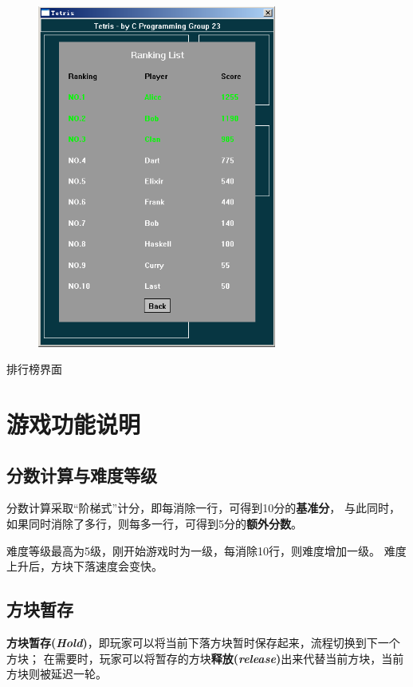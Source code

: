 \documentclass{style/ucasproposal}
\begin{document}
\begin{center}
\begin{figure}[H]
\center
    \includegraphics[width=0.7\textwidth]{./img/manual/9-ranking.png}
\end{figure}
排行榜界面
\end{center}


\section{游戏功能说明}
\subsection{分数计算与难度等级}
\label{score}
分数计算采取“阶梯式”计分，即每消除一行，可得到10分的\textbf{基准分}，
与此同时，如果同时消除了多行，则每多一行，可得到5分的\textbf{额外分数}。

难度等级最高为5级，刚开始游戏时为一级，每消除10行，则难度增加一级。
难度上升后，方块下落速度会变快。


\subsection{方块暂存}
\label{hold}
\textbf{方块暂存(\textit{Hold})}，即玩家可以将当前下落方块暂时保存起来，流程切换到下一个方块；
在需要时，玩家可以将暂存的方块\textbf{释放(\textit{release})}出来代替当前方块，当前方块则被延迟一轮。
\end{document}
